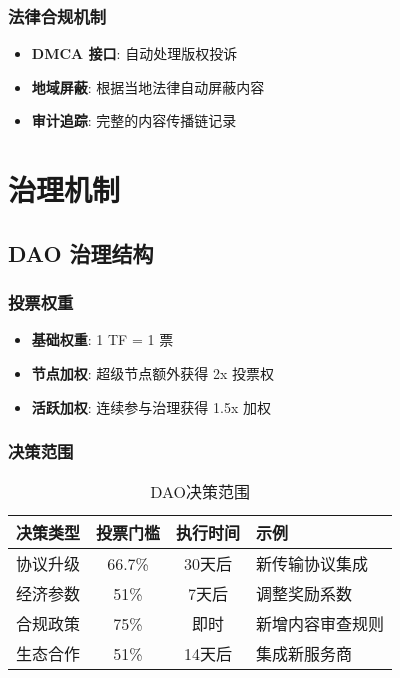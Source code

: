 \documentclass[12pt,a4paper]{article}
\begin{document}
\subsubsection{法律合规机制}
\begin{itemize}
    \item \textbf{DMCA 接口}: 自动处理版权投诉
    \item \textbf{地域屏蔽}: 根据当地法律自动屏蔽内容
    \item \textbf{审计追踪}: 完整的内容传播链记录
\end{itemize}

\section{治理机制}

\subsection{DAO 治理结构}

\subsubsection{投票权重}
\begin{itemize}
    \item \textbf{基础权重}: 1 TF = 1 票
    \item \textbf{节点加权}: 超级节点额外获得 2x 投票权
    \item \textbf{活跃加权}: 连续参与治理获得 1.5x 加权
\end{itemize}

\subsubsection{决策范围}

\begin{table}[h]
\centering
\begin{tabular}{|l|c|c|l|}
\hline
\textbf{决策类型} & \textbf{投票门槛} & \textbf{执行时间} & \textbf{示例} \\
\hline
协议升级 & 66.7\% & 30天后 & 新传输协议集成 \\
\hline
经济参数 & 51\% & 7天后 & 调整奖励系数 \\
\hline
合规政策 & 75\% & 即时 & 新增内容审查规则 \\
\hline
生态合作 & 51\% & 14天后 & 集成新服务商 \\
\hline
\end{tabular}
\caption{DAO决策范围}
\end{table}
\end{document}
